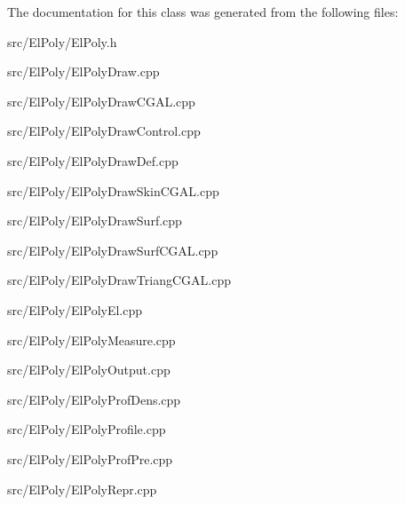 The documentation for this class was generated from the following files\+:\begin{DoxyCompactItemize}
\item 
src/\+El\+Poly/El\+Poly.\+h\item 
src/\+El\+Poly/El\+Poly\+Draw.\+cpp\item 
src/\+El\+Poly/El\+Poly\+Draw\+C\+G\+A\+L.\+cpp\item 
src/\+El\+Poly/El\+Poly\+Draw\+Control.\+cpp\item 
src/\+El\+Poly/El\+Poly\+Draw\+Def.\+cpp\item 
src/\+El\+Poly/El\+Poly\+Draw\+Skin\+C\+G\+A\+L.\+cpp\item 
src/\+El\+Poly/El\+Poly\+Draw\+Surf.\+cpp\item 
src/\+El\+Poly/El\+Poly\+Draw\+Surf\+C\+G\+A\+L.\+cpp\item 
src/\+El\+Poly/El\+Poly\+Draw\+Triang\+C\+G\+A\+L.\+cpp\item 
src/\+El\+Poly/El\+Poly\+El.\+cpp\item 
src/\+El\+Poly/El\+Poly\+Measure.\+cpp\item 
src/\+El\+Poly/El\+Poly\+Output.\+cpp\item 
src/\+El\+Poly/El\+Poly\+Prof\+Dens.\+cpp\item 
src/\+El\+Poly/El\+Poly\+Profile.\+cpp\item 
src/\+El\+Poly/El\+Poly\+Prof\+Pre.\+cpp\item 
src/\+El\+Poly/El\+Poly\+Repr.\+cpp\end{DoxyCompactItemize}
